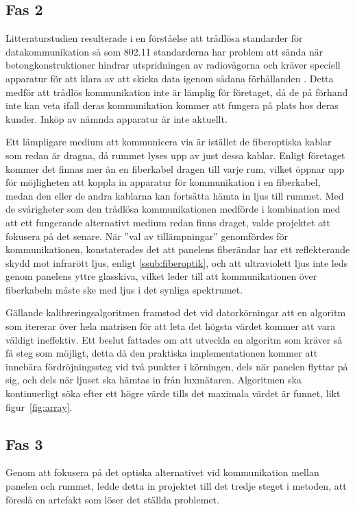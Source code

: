     \subsection{Fas 2} %
    \label{sub:steg_2}
        Litteraturstudien resulterade i en förståelse att trådlösa standarder för datakommunikation så som 802.11 standarderna har problem att sända när betongkonstruktioner hindrar utspridningen av radiovågorna och kräver speciell apparatur för att klara av att skicka data igenom sådana förhållanden \cite{11n}. Detta medför att trådlös kommunikation inte är lämplig för företaget, då de på förhand inte kan veta ifall deras kommunikation kommer att fungera på plats hos deras kunder. Inköp av nämnda apparatur är inte aktuellt. \bigskip

        Ett lämpligare medium att kommunicera via är istället de fiberoptiska kablar som redan är dragna, då rummet lyses upp av just dessa kablar. Enligt företaget kommer det finnas mer än en fiberkabel dragen till varje rum, vilket öppnar upp för möjligheten att koppla in apparatur för kommunikation i en fiberkabel, medan den eller de andra kablarna kan fortsätta hämta in ljus till rummet. Med de svårigheter som den trådlösa kommunikationen medförde i kombination med att ett fungerande alternativt medium redan finns draget, valde projektet att fokusera på det senare. När ''val av tillämpningar'' genomfördes för kommunikationen, konstaterades det att panelens fiberändar har ett reflekterande skydd mot infrarött ljus, enligt \ref{ssub:fiberoptik}, och att ultraviolett ljus inte leds genom panelens yttre glasskiva, vilket leder till att kommunikationen över fiberkabeln måste ske med ljus i det synliga spektrumet. \bigskip

        Gällande kalibreringsalgoritmen framstod det vid datorkörningar att en algoritm som itererar över hela matrisen för att leta det högsta värdet kommer att vara väldigt ineffektiv. Ett beslut fattades om att utveckla en algoritm som kräver så få steg som möjligt, detta då den praktiska implementationen kommer att innebära fördröjningssteg vid två punkter i körningen, dels när panelen flyttar på sig, och dels när ljuset ska hämtas in från luxmätaren. Algoritmen ska kontinuerligt söka efter ett högre värde tills det maximala värdet är funnet, likt figur~\ref{fig:array}.


    \subsection{Fas 3} %
    \label{sub:steg_3}
        Genom att fokusera på det optiska alternativet vid kommunikation mellan panelen och rummet, ledde detta in projektet till det tredje steget i metoden, att föreslå en artefakt som löser det ställda problemet. 

